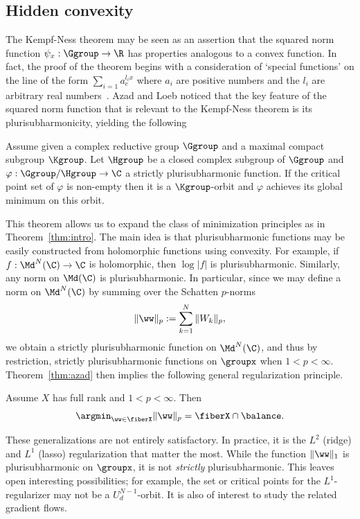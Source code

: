 \subsection{Hidden convexity}
\label{subsec:convexity}
The Kempf-Ness theorem may be seen as an assertion that the squared norm function $\psi_x: \Ggroup\to \R$ has properties analogous to a convex function. In fact, the proof of the theorem begins with a consideration of `special functions' on the line of the form  $\sum_{i=1}a_ e^{l_i x}$ where $a_i$ are positive numbers and the $l_i$ are arbitrary real numbers~\cite[\S 1]{Kempf}. Azad and Loeb noticed that the key feature of the squared norm function that is relevant to the Kempf-Ness theorem is its plurisubharmonicity, yielding the following 
\begin{theorem}
\label{thm:azad}
Assume given a complex reductive group $\Ggroup$ and a maximal compact subgroup $\Kgroup$. Let $\Hgroup$ be a closed complex subgroup of $\Ggroup$ and $\varphi:\Ggroup/\Hgroup \to \C$ a strictly plurisubharmonic function. If the critical point set of $\varphi$ is non-empty then it is a $\Kgroup$-orbit and $\varphi$ achieves its global minimum on this orbit.
\end{theorem}
This theorem allows us to expand the class of minimization principles as in Theorem~\ref{thm:intro}. The main idea is that plurisubharmonic functions may be easily constructed from holomorphic functions using convexity. For example, if $f: \Md^N(\C) \to \C$ is holomorphic, then $\log|f|$ is plurisubharmonic. Similarly, any norm on $\Md(\C)$ is plurisubharmonic. In particular, since we may define a norm on $\Md^N(\C)$ by summing over the Schatten $p$-norms
\begin{equation}
    \label{eq:schatten}
    \|\ww\|_{p} := \sum_{k=1}^N \|W_k \|_p, 
\end{equation}
we obtain a strictly plurisubharmonic function on $\Md^N(\C)$, and thus by restriction, strictly plurisubharmonic functions on $\groupx$ when $1<p<\infty$. 
Theorem~\ref{thm:azad} then implies the following general regularization principle.
\begin{theorem}
\label{thm:intro-revised} Assume $X$ has full rank and $1<p<\infty$. Then
\begin{equation}
\label{eq:variation2} \argmin_{\ww \in \fiberX} \|\ww\|_p= \fiberX \cap \balance.
\end{equation}   
\end{theorem}
These generalizations are not entirely satisfactory. In practice, it is the $L^2$ (ridge) and $L^1$ (lasso) regularization that matter the most. While the function $\|\ww\|_1$ is plurisubharmonic  on $\groupx$, it is not {\em strictly\/} plurisubharmonic. This leaves open interesting possibilities; for example, the set or critical points for the $L^1$-regularizer may not be a $U_d^{N-1}$-orbit. It is also of interest to study the related gradient flows.




